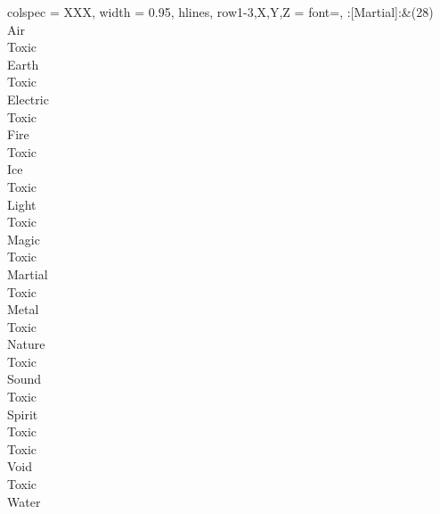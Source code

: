 \begin{longtblr}[
	caption = {2v1 Defending Weak},
	label = {2v1-Defending-Weak},
]{
	colspec = {XXX}, width = 0.95\linewidth,
	hlines,
	row{1-3,X,Y,Z} = {font=\bfseries},
}
	:[Martial]:&{(28)\\
	Air \\
	Toxic \\
	Earth \\
	Toxic \\
	Electric \\
	Toxic \\
	Fire \\
	Toxic \\
	Ice \\
	Toxic \\
	Light \\
	Toxic \\
	Magic \\
	Toxic \\
	Martial \\
	Toxic \\
	Metal \\
	Toxic \\
	Nature \\
	Toxic \\
	Sound \\
	Toxic \\
	Spirit \\
	Toxic \\
	Toxic \\
	Void \\
	Toxic \\
	Water \\
	}\\

\end{longtblr}
\onecolumn

